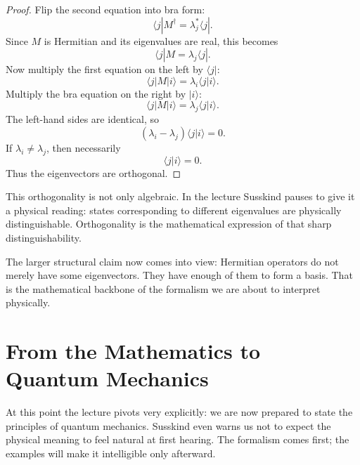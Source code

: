 \begin{proof}
Flip the second equation into bra form:
\begin{equation}
\langle j|M^\dagger=\lambda_j^*\langle j|.
\end{equation}
Since \(M\) is Hermitian and its eigenvalues are real, this becomes
\begin{equation}
\langle j|M=\lambda_j \langle j|.
\end{equation}
Now multiply the first equation on the left by \(\langle j|\):
\begin{equation}
\langle j|M|i\rangle=\lambda_i \langle j|i\rangle.
\end{equation}
Multiply the bra equation on the right by \(|i\rangle\):
\begin{equation}
\langle j|M|i\rangle=\lambda_j \langle j|i\rangle.
\end{equation}
The left-hand sides are identical, so
\begin{equation}
(\lambda_i-\lambda_j)\langle j|i\rangle=0.
\end{equation}
If \(\lambda_i\neq\lambda_j\), then necessarily
\begin{equation}
\langle j|i\rangle=0.
\end{equation}
Thus the eigenvectors are orthogonal.
\end{proof}

This orthogonality is not only algebraic. In the lecture Susskind pauses to give it a physical reading: states corresponding to different eigenvalues are physically distinguishable. Orthogonality is the mathematical expression of that sharp distinguishability.

The larger structural claim now comes into view: Hermitian operators do not merely have some eigenvectors. They have enough of them to form a basis. That is the mathematical backbone of the formalism we are about to interpret physically.

\section{From the Mathematics to Quantum Mechanics}

At this point the lecture pivots very explicitly: we are now prepared to state the principles of quantum mechanics. Susskind even warns us not to expect the physical meaning to feel natural at first hearing. The formalism comes first; the examples will make it intelligible only afterward.

